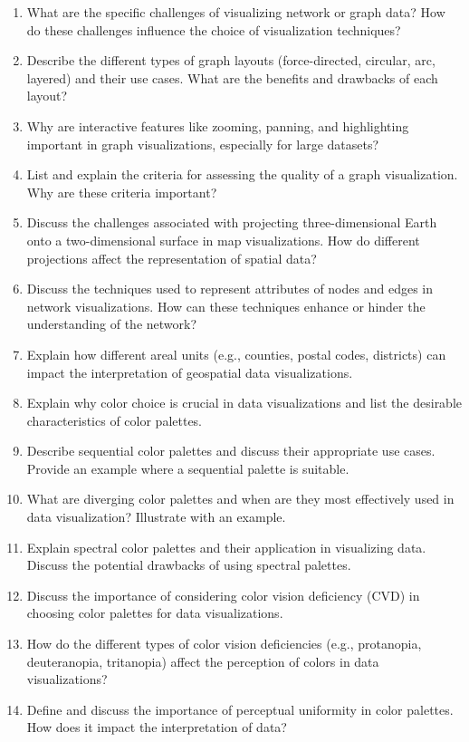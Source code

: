 \begin{enumerate}[nosep]
    \item What are the specific challenges of visualizing network or graph data? How do these challenges influence the choice of visualization techniques?
    \item Describe the different types of graph layouts (force-directed, circular, arc, layered) and their use cases. What are the benefits and drawbacks of each layout?
    \item Why are interactive features like zooming, panning, and highlighting important in graph visualizations, especially for large datasets?
    \item List and explain the criteria for assessing the quality of a graph visualization. Why are these criteria important?
    \item Discuss the challenges associated with projecting three-dimensional Earth onto a two-dimensional surface in map visualizations. How do different projections affect the representation of spatial data?
    \item Discuss the techniques used to represent attributes of nodes and edges in network visualizations. How can these techniques enhance or hinder the understanding of the network?
    \item Explain how different areal units (e.g., counties, postal codes, districts) can impact the interpretation of geospatial data visualizations.
    \item Explain why color choice is crucial in data visualizations and list the desirable characteristics of color palettes.
    \item Describe sequential color palettes and discuss their appropriate use cases. Provide an example where a sequential palette is suitable.
    \item What are diverging color palettes and when are they most effectively used in data visualization? Illustrate with an example.
    \item Explain spectral color palettes and their application in visualizing data. Discuss the potential drawbacks of using spectral palettes.
    \item Discuss the importance of considering color vision deficiency (CVD) in choosing color palettes for data visualizations.
    \item How do the different types of color vision deficiencies (e.g., protanopia, deuteranopia, tritanopia) affect the perception of colors in data visualizations?
    \item Define and discuss the importance of perceptual uniformity in color palettes. How does it impact the interpretation of data?

\end{enumerate}
